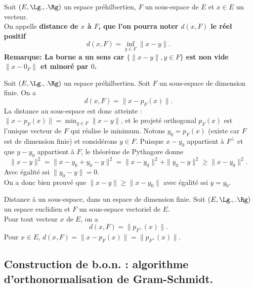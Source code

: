 \documentclass[11pt]{article}
\begin{document}
\begin{defi}{}{}
    Soit $(E,\Lg.,.\Rg)$ un espace préhilbertien, $F$ un sous-espace de $E$ et $x\in E$ un vecteur.\\
    On appelle \bf{distance} de $x$ à $F$, que l'on pourra noter $d(x,F)$ le réel positif
    \begin{equation*}
        d(x,F)=\inf_{y\in F}\|x-y\|.
    \end{equation*}
    \bf{Remarque:} La borne a un sens car $\{\|x-y\|, y\in F\}$ est non vide $\|x-0_F\|$ et minoré par $0$.
\end{defi}

\begin{prop}{}{}
    Soit $(E,\Lg.,.\Rg)$ un espace préhilbertien. Soit $F$ un sous-espace de dimension finie. On a
    \begin{equation*}
        \boxed{d(x,F)=\|x-p_F(x)\|}.
    \end{equation*}
    La distance au sous-espace est donc atteinte : $\|x-p_F(x)\|=\min_{y\in F}\|x-y\|$, et le projeté orthogonal $p_F(x)$ est l'unique vecteur de $F$ qui réalise le minimum.
    \tcblower
    Notons $y_0=p_F(x)$ (existe car $F$ est de dimension finie) et considérons $y\in F$. Puisque $x-y_0$ appartient à $F^\bot$ et que $y-y_0$ appartient à $F$, le théorème de Pythagore donne
    \begin{equation*}
        \|x-y\|^2=\|x-y_0+y_0-y\|^2=\|x-y_0\|^2+\|y_0-y\|^2\geq\|x-y_0\|^2.
    \end{equation*} 
    Avec égalité ssi $\|y_0-y\|=0$.\\
    On a donc bien prouvé que $\|x-y\|\geq\|x-y_0\|$ avec égalité ssi $y=y_0$.
\end{prop}

\begin{corr}{Distance à un sous-espace, dans un espace de dimension finie.}{}
    Soit $(E,\Lg.,.\Rg)$ un espace euclidien et $F$ un sous-espace vectoriel de $E$.\\
    Pour tout vecteur $x$ de $E$, on a
    \begin{equation*}
        d(x,F)=\|p_{F^\bot}(x)\|.
    \end{equation*}
    \tcblower
    Pour $x\in E$, $d(x,F)=\|x-p_F(x)\|=\|p_{F^\bot}(x)\|$.
\end{corr}
\pagebreak
\subsection{Construction de b.o.n. : algorithme d'orthonormalisation de Gram-Schmidt.}
\end{document}
